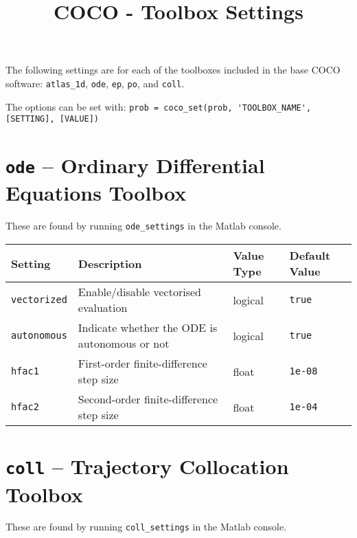\documentclass[11pt]{article}
\title{COCO - Toolbox Settings}
\author{}
\date{}
\begin{document}
\maketitle

The following settings are for each of the toolboxes included in the base COCO software: \verb!atlas_1d!, \verb!ode!, \verb!ep!, \verb!po!, and \verb!coll!.

The options can be set with: \verb!prob = coco_set(prob, 'TOOLBOX_NAME', [SETTING], [VALUE])!

\section*{\texttt{ode} -- Ordinary Differential Equations Toolbox}

These are found by running \verb!ode_settings! in the Matlab console.

\begin{table}[h]
  \centering
  \begin{tabular}{l|l|l|l}
    \textbf{Setting}  & \textbf{Description}                          & \textbf{Value Type} & \textbf{Default Value} \\[1ex] \hline
    \verb!vectorized! & Enable/disable vectorised evaluation          & logical             & \verb!true!            \\[1ex]
    \verb!autonomous! & Indicate whether the ODE is autonomous or not & logical             & \verb!true!            \\[1ex]
    \verb!hfac1!      & First-order finite-difference step size       & float               & \verb!1e-08!           \\[1ex]
    \verb!hfac2!      & Second-order finite-difference step size      & float               & \verb!1e-04!
  \end{tabular}
\end{table}

\clearpage
\section*{\texttt{coll} -- Trajectory Collocation Toolbox}

These are found by running \verb!coll_settings! in the Matlab console.
\end{document}

